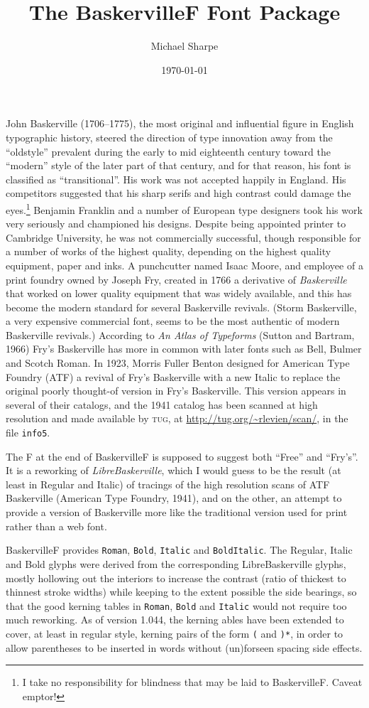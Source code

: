 \documentclass[11pt]{article}
\title{The BaskervilleF Font Package}
\author{Michael Sharpe}
\date{\today}  %
\begin{document}
\maketitle
John Baskerville (1706--1775), the most original and influential figure in English typographic history, steered the direction of type innovation away from the ``oldstyle'' prevalent during the early to mid eighteenth century toward the ``modern'' style of the later part of that century, and for that reason, his font  is classified as ``transitional''. His work was not accepted happily in England. His competitors suggested that his sharp serifs and high contrast could damage the eyes.\footnote{I take no responsibility for blindness that may  be laid to BaskervilleF. Caveat emptor!} Benjamin Franklin and a number of European type designers took his work very seriously and championed his designs. Despite being appointed printer to Cambridge University, he was not commercially successful, though responsible for a number of works of the highest quality, depending on the highest quality equipment, paper and inks. A punchcutter named Isaac Moore, and employee of a print foundry owned by Joseph Fry, created in 1766 a derivative of \emph{Baskerville} that worked on lower quality equipment that was widely available, and this has become the modern standard for several 
Baskerville revivals. (Storm Baskerville, a very expensive commercial font, seems to be the most authentic of modern Baskerville revivals.) According to \emph{An Atlas of Typeforms} (Sutton and Bartram, 1966) Fry's Baskerville has more in common with later fonts such as Bell, Bulmer and Scotch Roman.  In 1923, Morris Fuller Benton designed for American Type Foundry (ATF) a revival of Fry's Baskerville with a new Italic to replace the original poorly thought-of version in Fry's Baskerville. This version appears in several of their catalogs, and the 1941 catalog has been scanned at high resolution and made available by \textsc{tug}, at \url{http://tug.org/~rlevien/scan/}, in the file {\tt info5}.

The F at the end of BaskervilleF is supposed to suggest both ``Free'' and ``Fry's''. It is  a reworking of \emph{LibreBaskerville}, which I would guess to be the result (at least in Regular and Italic) of  tracings of the high resolution scans of ATF Baskerville (American Type Foundry, 1941), and on the other, an attempt to provide a version of Baskerville more like the traditional version used for print rather than a web font. 

BaskervilleF provides {\tt Roman}, {\tt Bold}, {\tt Italic} and {\tt BoldItalic}. The Regular, Italic and Bold glyphs were derived from the corresponding LibreBaskerville glyphs, mostly hollowing out the interiors to increase the contrast (ratio of thickest to thinnest stroke widths) while keeping to the extent possible the side bearings, so that the good kerning tables in {\tt Roman}, {\tt Bold} and {\tt Italic} would not require too much reworking. As of version 1.044, the kerning ables have been extended to cover, at least in regular style, kerning pairs of the form {\tt*(} and {\tt)*}, in order to allow parentheses to be inserted in words without (un)forseen spacing side effects. 
\end{document}
